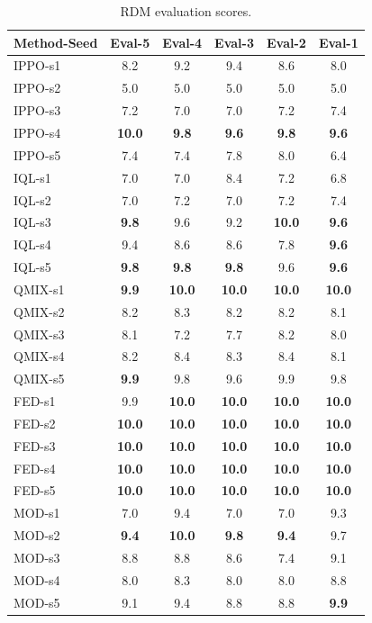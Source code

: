 \documentclass[drones,article,accept,pdftex,moreauthors]{Definitions/mdpi}
\begin{document}
\begin{table}[H]
\centering
\caption{RDM evaluation scores.}
\label{tab:rdm-evals}
\scriptsize
\begin{tabularx}{\textwidth}{@{}lCCCCC@{}}
\toprule
\textbf{Method-Seed} & \textbf{Eval-5} & \textbf{Eval-4} & \textbf{Eval-3} & \textbf{Eval-2} & \textbf{Eval-1} \\
\midrule
IPPO-s1 & 8.2 & 9.2 & 9.4 & 8.6 & 8.0 \\
IPPO-s2 & 5.0 & 5.0 & 5.0 & 5.0 & 5.0 \\
IPPO-s3 & 7.2 & 7.0 & 7.0 & 7.2 & 7.4 \\
IPPO-s4 & \textbf{10.0} & \textbf{9.8} & \textbf{9.6} & \textbf{9.8} & \textbf{9.6} \\
IPPO-s5 & 7.4 & 7.4 & 7.8 & 8.0 & 6.4 \\
\midrule
IQL-s1 & 7.0 & 7.0 & 8.4 & 7.2 & 6.8 \\
IQL-s2 & 7.0 & 7.2 & 7.0 & 7.2 & 7.4 \\
IQL-s3 & \textbf{9.8} & 9.6 & 9.2 & \textbf{10.0} & \textbf{9.6} \\
IQL-s4 & 9.4 & 8.6 & 8.6 & 7.8 & \textbf{9.6} \\
IQL-s5 & \textbf{9.8} & \textbf{9.8} & \textbf{9.8} & 9.6 & \textbf{9.6} \\
\midrule
QMIX-s1 & \textbf{9.9} & \textbf{10.0} & \textbf{10.0} & \textbf{10.0} & \textbf{10.0} \\
QMIX-s2 & 8.2 & 8.3 & 8.2 & 8.2 & 8.1 \\
QMIX-s3 & 8.1 & 7.2 & 7.7 & 8.2 & 8.0 \\
QMIX-s4 & 8.2 & 8.4 & 8.3 & 8.4 & 8.1 \\
QMIX-s5 & \textbf{9.9} & 9.8 & 9.6 & 9.9 & 9.8 \\
\midrule
FED-s1 & 9.9 & \textbf{10.0} & \textbf{10.0} & \textbf{10.0} & \textbf{10.0} \\
FED-s2 & \textbf{10.0} & \textbf{10.0} & \textbf{10.0} & \textbf{10.0} & \textbf{10.0} \\
FED-s3 & \textbf{10.0} & \textbf{10.0} & \textbf{10.0} & \textbf{10.0} & \textbf{10.0} \\
FED-s4 & \textbf{10.0} & \textbf{10.0} & \textbf{10.0} & \textbf{10.0} & \textbf{10.0} \\
FED-s5 & \textbf{10.0} & \textbf{10.0} & \textbf{10.0} & \textbf{10.0} & \textbf{10.0} \\
\midrule
MOD-s1 & 7.0 & 9.4 & 7.0 & 7.0 & 9.3 \\
MOD-s2 & \textbf{9.4} & \textbf{10.0} & \textbf{9.8} & \textbf{9.4} & 9.7 \\
MOD-s3 & 8.8 & 8.8 & 8.6 & 7.4 & 9.1 \\
MOD-s4 & 8.0 & 8.3 & 8.0 & 8.0 & 8.8 \\
MOD-s5 & 9.1 & 9.4 & 8.8 & 8.8 & \textbf{9.9} \\
\bottomrule
\end{tabularx}
\end{table}
\end{document}
